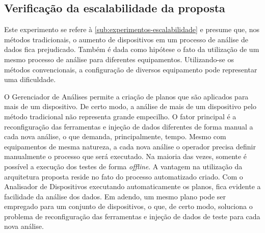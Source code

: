 \subsection{Verificação da escalabilidade da proposta}

Este experimento se refere à \cref{sub:experimentos-escalabilidade} e presume que, nos métodos
tradicionais, o aumento de dispositivos em um processo de análise de dados fica prejudicado. Também
é dada como hipótese o fato da utilização de um mesmo processo de análise para diferentes
equipamentos. Utilizando-se os métodos convencionais, a configuração de diversos equipamento pode
representar uma dificuldade.

O Gerenciador de Análises permite a criação de planos que são aplicados para mais de um dispositivo.
De certo modo, a análise de mais de um dispositivo pelo método tradicional não representa grande
empecilho. O fator principal é a reconfiguração das ferramentas e injeção de dados diferentes de
forma manual a cada nova análise, o que demanda, principalmente, tempo. Mesmo com equipamentos de
mesma natureza, a cada nova análise o operador precisa definir manualmente o processo que será
executado. Na maioria das vezes, somente é possível a execução dos testes de forma \textit{offline}.
A vantagem na utilização da arquitetura proposta reside no fato do processo automatizado criado. Com
o Analisador de Dispositivos executando automaticamente os planos, fica evidente a facilidade da
análise dos dados. Em adendo, um mesmo plano pode ser empregado para um conjunto de dispositivos, o
que, de certo modo, soluciona o problema de reconfiguração das ferramentas e injeção de dados de
teste para cada nova análise.
